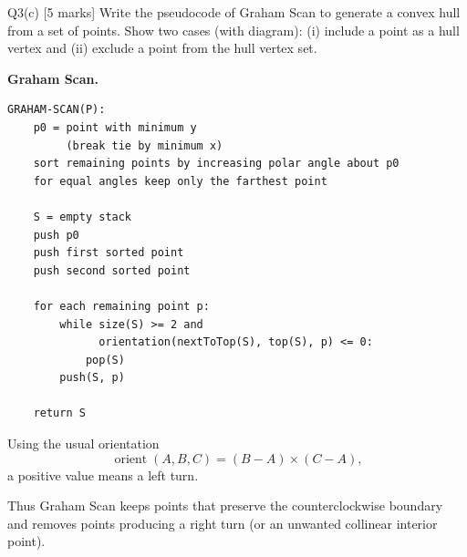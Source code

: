 \documentclass[10.5pt,a4paper]{article}
\begin{document}
\begin{questionbox}{Q3(c) [5 marks]}
Write the pseudocode of Graham Scan to generate a convex hull from a set of points. Show two cases (with diagram): (i) include a point as a hull vertex and (ii) exclude a point from the hull vertex set.
\end{questionbox}

\begin{answerbox}
\textbf{Graham Scan.}
\begin{lstlisting}
GRAHAM-SCAN(P):
    p0 = point with minimum y
         (break tie by minimum x)
    sort remaining points by increasing polar angle about p0
    for equal angles keep only the farthest point

    S = empty stack
    push p0
    push first sorted point
    push second sorted point

    for each remaining point p:
        while size(S) >= 2 and
              orientation(nextToTop(S), top(S), p) <= 0:
            pop(S)
        push(S, p)

    return S
\end{lstlisting}

Using the usual orientation
\[
\operatorname{orient}(A,B,C)=(B-A)\times(C-A),
\]
a positive value means a left turn.

\begin{center}
\end{center}

Thus Graham Scan keeps points that preserve the counterclockwise boundary and removes points producing a right turn (or an unwanted collinear interior point).
\end{answerbox}
\end{document}
